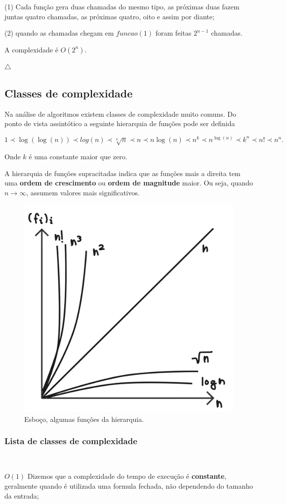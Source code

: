 (1) Cada função gera duas chamadas do mesmo tipo, as próximas duas fazem juntas quatro chamadas, as próximas quatro, oito e assim por diante;

(2) quando as chamadas chegam em $funcao(1)$ foram feitas $2^{n-1}$ chamadas.

A complexidade é $O(2^n)$.
 

{\raggedleft $\bigtriangleup$ \par}

\subsection{Classes de complexidade}

Na análise de algoritmos existem classes de complexidade muito comuns. Do ponto de vista assintótico a seguinte hierarquia de funções pode ser definida

\[1\prec \log(\log(n)) \prec log(n) \prec \sqrt[k]{n} \prec n \prec n\log(n) \prec n^k \prec n^{\log(n)} \prec k^n \prec n!\prec n^n.\]

Onde $k$ é uma constante maior que zero.

A hierarquia de funções supracitadas indica que as funções mais a direita tem uma \textbf{ordem de crescimento} ou \textbf{ordem de magnitude} maior. Ou seja, quando $n\rightarrow\infty$, assumem valores mais significativos.

\begin{figure}
  \centering
  \includegraphics[width=0.4\linewidth]{img/Classes.png}
    \caption{Esboço, algumas funções da hierarquia.}
    \label{Hierarquia}
\end{figure}

\subsubsection{Lista de classes de complexidade}
\

$O(1)$ Dizemos que a complexidade do tempo de execução é \textbf{constante}, geralmente quando é utilizada uma formula fechada, não dependendo do tamanho da entrada;

